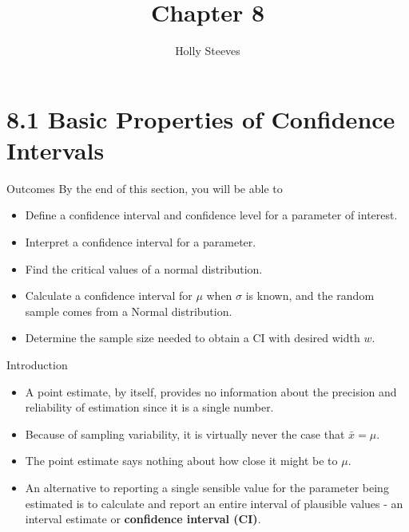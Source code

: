 \documentclass[
  ignorenonframetext,
]{beamer}
\title{Chapter 8}
\author{Holly Steeves}
\date{}
\providecommand{\tightlist}{%
  \setlength{\itemsep}{0pt}\setlength{\parskip}{0pt}}\usepackage{longtable,booktabs,array}
\begin{document}
\frame{\titlepage}
\ifdefined\Shaded\renewenvironment{Shaded}{\begin{tcolorbox}[enhanced, frame hidden, borderline west={3pt}{0pt}{shadecolor}, interior hidden, boxrule=0pt, breakable, sharp corners]}{\end{tcolorbox}}\fi

\hypertarget{basic-properties-of-confidence-intervals}{%
\section{8.1 Basic Properties of Confidence
Intervals}\label{basic-properties-of-confidence-intervals}}

\begin{frame}{Outcomes}
\protect\hypertarget{outcomes}{}
By the end of this section, you will be able to

\begin{itemize}[<+->]
\tightlist
\item
  Define a confidence interval and confidence level for a parameter of
  interest.
\item
  Interpret a confidence interval for a parameter.
\item
  Find the critical values of a normal distribution.
\item
  Calculate a confidence interval for \(\mu\) when \(\sigma\) is known,
  and the random sample comes from a Normal distribution.
\item
  Determine the sample size needed to obtain a CI with desired width
  \(w\).
\end{itemize}
\end{frame}

\begin{frame}{Introduction}
\protect\hypertarget{introduction}{}
\begin{itemize}[<+->]
\tightlist
\item
  A point estimate, by itself, provides no information about the
  precision and reliability of estimation since it is a single number.
\item
  Because of sampling variability, it is virtually never the case that
  \(\bar{x} = \mu\).
\item
  The point estimate says nothing about how close it might be to
  \(\mu\).
\item
  An alternative to reporting a single sensible value for the parameter
  being estimated is to calculate and report an entire interval of
  plausible values - an interval estimate or \textbf{confidence interval
  (CI)}.
\end{itemize}
\end{frame}
\end{document}
